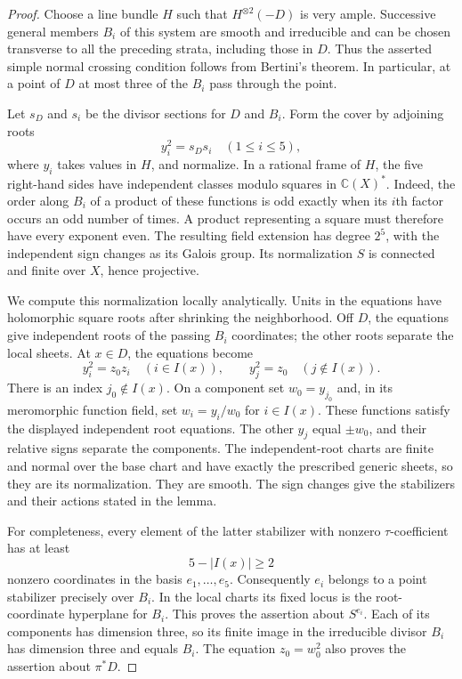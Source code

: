 \begin{proof}
Choose a line bundle $H$ such that $H^{\otimes2}(-D)$ is very ample.
Successive general members $B_i$ of this system are smooth and
irreducible and can be chosen transverse to all the preceding strata,
including those in $D$.  Thus the asserted simple normal crossing
condition follows from Bertini's theorem.  In particular, at a point of
$D$ at most three of the $B_i$ pass through the point.

Let $s_D$ and $s_i$ be the divisor sections for $D$ and $B_i$.  Form the
cover by adjoining roots
\[
 y_i^2=s_Ds_i\quad(1\leq i\leq5),
\]
where $y_i$ takes values in $H$, and normalize.  In a rational frame of
$H$, the five right-hand sides have independent classes modulo squares
in $\mathbb C(X)^*$.  Indeed, the order along $B_i$ of a product of these
functions is odd exactly when its $i$th factor occurs an odd number of
times.  A product representing a square must therefore have every
exponent even.  The resulting field extension has degree $2^5$, with
the independent sign changes as its Galois group.  Its normalization
$S$ is connected and finite over $X$, hence projective.

We compute this normalization locally analytically.  Units in the
equations have holomorphic square roots after shrinking the
neighborhood.  Off $D$, the equations give independent roots of the
passing $B_i$ coordinates; the other roots separate the local sheets.
At $x\in D$, the equations become
\[
 y_i^2=z_0z_i\quad(i\in I(x)),\qquad
 y_j^2=z_0\quad(j\notin I(x)).
\]
There is an index $j_0\notin I(x)$.  On a component set $w_0=y_{j_0}$
and, in its meromorphic function field, set $w_i=y_i/w_0$ for
$i\in I(x)$.  These functions satisfy the displayed independent root
equations.  The other $y_j$ equal $\pm w_0$, and their relative signs
separate the components.  The independent-root charts are finite and
normal over the base chart and have exactly the prescribed generic
sheets, so they are its normalization.  They are smooth.  The sign
changes give the stabilizers and their actions stated in the lemma.

For completeness, every element of the latter stabilizer with
nonzero $\tau$-coefficient has at least
\[
 5-|I(x)|\geq2
\]
nonzero coordinates in the basis $e_1,\ldots,e_5$.  Consequently $e_i$
belongs to a point stabilizer precisely over $B_i$.  In the local
charts its fixed locus is the root-coordinate hyperplane for $B_i$.
This proves the assertion about $S^{e_i}$.  Each of its components has
dimension three, so its finite image in the irreducible divisor $B_i$
has dimension three and equals $B_i$.  The equation $z_0=w_0^2$ also
proves the assertion about $\pi^*D$.
\end{proof}


